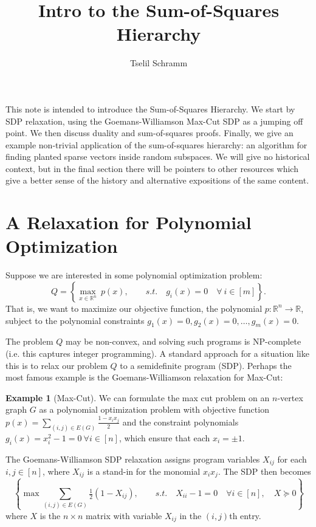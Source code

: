 \documentclass[a4paper,11pt]{article}
\title{Intro to the Sum-of-Squares Hierarchy}
\author{Tselil Schramm}
\date{}
\newcommand{\R}{\mathbb{R}}
\theoremstyle{definition}
\newtheorem{example}{Example}
\begin{document}
\maketitle

This note is intended to introduce the Sum-of-Squares Hierarchy.
We start by SDP relaxation, using the Goemans-Williamson Max-Cut SDP as a jumping off point.
We then discuss duality and sum-of-squares proofs.
Finally, we give an example non-trivial application of the sum-of-squares hierarchy: an algorithm for finding planted sparse vectors inside random subspaces.
We will give no historical context, but in the final section there will be pointers to other resources which give a better sense of the history and alternative expositions of the same content.

\section{A Relaxation for Polynomial Optimization}

Suppose we are interested in some polynomial optimization problem:
\[
Q
= \left\{\max_{x \in \R^n}\ p(x),\qquad
s.t.\quad g_i(x) = 0 \quad \forall\ i \in [m]\right\}.
\]
That is, we want to maximize our objective function, the polynomial $p:\R^n\to \R$, subject to the polynomial constraints $g_1(x) = 0, g_2(x) = 0,\ldots, g_m(x) = 0$.

The problem $Q$ may be non-convex, and solving such programs is NP-complete (i.e. this captures integer programming).
A standard approach for a situation like this is to relax our problem $Q$ to a semidefinite program (SDP).
Perhaps the most famous example is the Goemans-Williamson relaxation for Max-Cut:

\begin{example}[Max-Cut]
We can formulate the max cut problem on an $n$-vertex graph $G$ as a polynomial optimization problem with objective function $p(x) = \sum_{(i,j) \in E(G)} \frac{1- x_i x_j}{2}$ and the constraint polynomials $g_i(x) = x_i^2 - 1 = 0\ \forall i\in[n]$, which ensure that each $x_i = \pm 1$.

The Goemans-Williamson SDP relaxation assigns program variables $X_{ij}$ for each $i,j \in [n]$, where $X_{ij}$ is a stand-in for the monomial $x_i x_j$.
The SDP then becomes
\[
\left\{
\max \sum_{(i,j) \in E(G)}\tfrac{1}{2}(1 - X_{ij}), \qquad s.t. \quad X_{ii} -1= 0\quad \forall i \in [n],\quad X \succeq 0 \right\}
\]
where $X$ is the $n \times n$ matrix with variable $X_{ij}$ in the $(i,j)$th entry.
\end{example}
\end{document}
